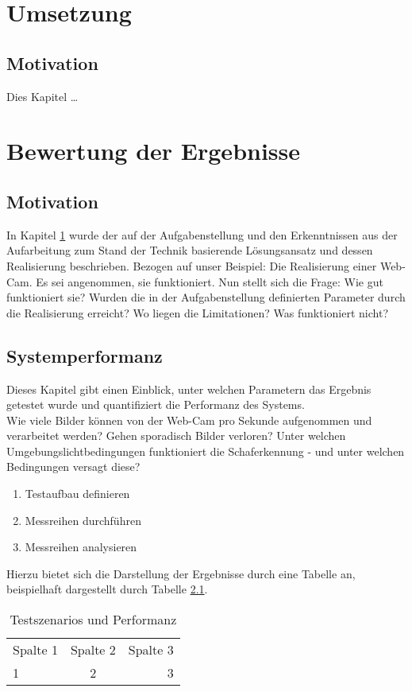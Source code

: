 \chapter{Umsetzung}
\label{sec:Umsetzung}

\section{Motivation}

Dies Kapitel \dots

\chapter{Bewertung der Ergebnisse}
\label{sec:Bewertung}

\section{Motivation}

In Kapitel \ref{sec:Umsetzung} wurde der auf der Aufgabenstellung und den Erkenntnissen aus der Aufarbeitung zum Stand der Technik basierende Lösungsansatz und dessen Realisierung beschrieben. Bezogen auf unser Beispiel: Die Realisierung einer Web-Cam. 
Es sei angenommen, sie funktioniert. Nun stellt sich die Frage: Wie gut funktioniert sie? Wurden die in der Aufgabenstellung definierten Parameter durch die Realisierung erreicht? Wo liegen die Limitationen? Was funktioniert nicht? 
 
\section{Systemperformanz}
\label{sec:Performanz}
 
Dieses Kapitel gibt einen Einblick, unter welchen Parametern das Ergebnis getestet wurde und quantifiziert die Performanz des Systems. \\

\example Wie viele Bilder können von der Web-Cam pro Sekunde aufgenommen und verarbeitet werden? Gehen sporadisch Bilder verloren? Unter welchen Umgebungslichtbedingungen funktioniert die Schaferkennung - und unter welchen Bedingungen versagt diese? 

\begin{enumerate}
\item Testaufbau definieren
\item Messreihen durchführen
\item Messreihen analysieren
\end{enumerate}

Hierzu bietet sich die Darstellung der Ergebnisse durch eine Tabelle an, beispielhaft dargestellt durch Tabelle \ref{tab:Ergebnis}.

\begin{table}[htb]

\begin{tabular}{lcr}
  Spalte 1 & Spalte 2 & Spalte 3 \\
  1 & 2 & 3 \\
 \end{tabular}
 \caption{Testszenarios und Performanz}
\label{tab:Ergebnis}
\end{table}